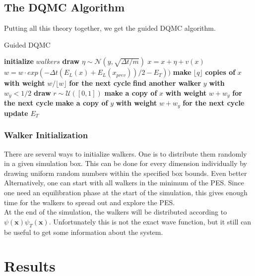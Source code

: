 \documentclass [12pt]{report}
\begin{document}
\section{The DQMC Algorithm}
Putting all this theory together, we get the guided DQMC algorithm.

\begin{algorithm}
\caption{Guided DQMC}\label{dqmc}
\begin{algorithmic}[1]
\State \textbf{initialize} $walkers$
		\State \textbf{draw} $\eta \sim \mathcal{N}(y,\sqrt{\Delta t/m})$
		\State $x = x + \eta + v(x)$ 
		\State $w = w \cdot exp(-\Delta t (E_L(x)+E_L(x_{prev}))/2 - E_T))$
		\State \textbf{make} $\lfloor q \rfloor$ \textbf{copies of} $x$ \textbf{with weight} $w/\lfloor w \rfloor$ \textbf{for the next cycle}
		\EndIf
		\State \textbf{find another walker} $y$ \textbf{with} $w_y < 1/2$
		\State \textbf{draw} $r \sim \mathcal{U}([0,1])$
		\State \textbf{make a copy of} $x$ \textbf{with weight} $w+w_y$ \textbf{for the next cycle}
		\Else
		\State \textbf{make a copy of} $y$ \textbf{with weight} $w+w_y$ \textbf{for the next cycle}
		\EndIf
		\EndIf 
	\EndFor
	\State \textbf{update} $E_T$ 
\EndFor 
\EndProcedure
\end{algorithmic}
\end{algorithm}
\subsection{Walker Initialization}
There are several ways to initialize walkers. One is to distribute them randomly in a given simulation box. This can be done for every dimension individually by drawing uniform random numbers within the specified box bounds. Even better  Alternatively, one can start with all walkers in the minimum of the PES. Since one need an equilibration phase at the start of the simulation, this gives enough time for the walkers to spread out and explore the PES.\\ 
At the end of the simulation, the walkers will be distributed according to $\psi(\bm{x})\psi_T(\bm{x})$. Unfortunately this is not the exact wave function, but it still can be useful to get some information about the system.

\chapter{Results}
\end{document}
